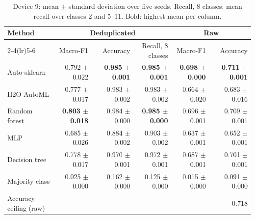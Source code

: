 \begin{table}[t]
\centering
\caption{Device 9: mean $\pm$ standard deviation over five seeds. Recall, 8 classes: mean recall over classes 2 and 5--11. Bold: highest mean per column.}
\label{tab:dev9}
\scriptsize
\setlength{\tabcolsep}{3pt}
\begin{tabular}{@{}lrrrrr@{}}
\toprule
Method & \multicolumn{3}{c}{Deduplicated} & \multicolumn{2}{c}{Raw} \\
\cmidrule(lr){2-4}\cmidrule(lr){5-6}
 & Macro-F1 & Accuracy & Recall, 8 classes & Macro-F1 & Accuracy \\
\midrule
Auto-sklearn & 0.792 $\pm$ 0.022 & \textbf{0.985 $\pm$ 0.001} & \textbf{0.985 $\pm$ 0.001} & \textbf{0.698 $\pm$ 0.000} & \textbf{0.711 $\pm$ 0.001} \\
H2O AutoML & 0.777 $\pm$ 0.017 & 0.983 $\pm$ 0.002 & 0.983 $\pm$ 0.002 & 0.664 $\pm$ 0.020 & 0.683 $\pm$ 0.016 \\
Random forest & \textbf{0.803 $\pm$ 0.018} & 0.984 $\pm$ 0.000 & \textbf{0.985 $\pm$ 0.000} & 0.696 $\pm$ 0.001 & 0.709 $\pm$ 0.001 \\
MLP & 0.685 $\pm$ 0.026 & 0.884 $\pm$ 0.002 & 0.903 $\pm$ 0.002 & 0.637 $\pm$ 0.001 & 0.652 $\pm$ 0.001 \\
Decision tree & 0.778 $\pm$ 0.017 & 0.970 $\pm$ 0.001 & 0.972 $\pm$ 0.001 & 0.687 $\pm$ 0.001 & 0.701 $\pm$ 0.001 \\
Majority class & 0.025 $\pm$ 0.000 & 0.162 $\pm$ 0.000 & 0.125 $\pm$ 0.000 & 0.015 $\pm$ 0.000 & 0.091 $\pm$ 0.000 \\
\midrule
Accuracy ceiling (raw) & -- & -- & -- & -- & 0.718 \\
\bottomrule
\end{tabular}
\end{table}
